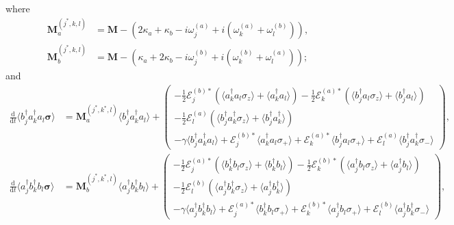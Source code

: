 \documentclass{article}
\newcommand{\ddt}[1][]{\frac{\mathrm{d} #1}{\mathrm{d}t}}
\begin{document}
where
\begin{subequations}
	\begin{align}
		\bm{M}^{(j^{*}, k, l)}_{a} &= \bm{M} - \left( 2\kappa_{a} + \kappa_{b} - i \omega_{j}^{(a)} + i \left( \omega_{k}^{(a)} + \omega_{l}^{(b)} \right) \right), \\
		\bm{M}^{(j^{*}, k, l)}_{b} &= \bm{M} - \left( \kappa_{a} + 2\kappa_{b} - i \omega_{j}^{(b)} + i \left( \omega_{k}^{(b)} + \omega_{l}^{(a)} \right) \right);
	\end{align}
\end{subequations}
and
\begin{subequations}
	\begin{align}
		\ddt \langle b^{\dagger}_{j} a^{\dagger}_{k} a_{l} \bm{\sigma} \rangle &= \bm{M}^{(j^{*}, k^{*}, l)}_{a} \langle b^{\dagger}_{j} a^{\dagger}_{k} a_{l} \rangle +
		\begin{pmatrix}
			-\frac{1}{2} \mathcal{E}_{j}^{(b) *} \left( \langle a^{\dagger}_{k} a_{l} \sigma_{z} \rangle + \langle a^{\dagger}_{k} a_{l} \rangle \right) - \frac{1}{2} \mathcal{E}_{k}^{(a) *} \left( \langle b^{\dagger}_{j} a_{l} \sigma_{z} \rangle + \langle b^{\dagger}_{j} a_{l} \rangle \right) \\
			-\frac{1}{2} \mathcal{E}_{l}^{(a)} \left( \langle b^{\dagger}_{j} a^{\dagger}_{k} \sigma_{z} \rangle + \langle b^{\dagger}_{j} a^{\dagger}_{k} \rangle \right) \\
			-\gamma \langle b^{\dagger}_{j} a^{\dagger}_{k} a_{l} \rangle + \mathcal{E}_{j}^{(b) *} \langle a^{\dagger}_{k} a_{l} \sigma_{+} \rangle + \mathcal{E}_{k}^{(a) *} \langle b^{\dagger}_{j} a_{l} \sigma_{+} \rangle + \mathcal{E}_{l}^{(a)} \langle b^{\dagger}_{j} a^{\dagger}_{k} \sigma_{-} \rangle
		\end{pmatrix}, \\
		\ddt \langle a^{\dagger}_{j} b^{\dagger}_{k} b_{l} \bm{\sigma} \rangle &= \bm{M}^{(j^{*}, k^{*}, l)}_{b} \langle a^{\dagger}_{j} b^{\dagger}_{k} b_{l} \rangle +
		\begin{pmatrix}
			-\frac{1}{2} \mathcal{E}_{j}^{(a) *} \left( \langle b^{\dagger}_{k} b_{l} \sigma_{z} \rangle + \langle b^{\dagger}_{k} b_{l} \rangle \right) - \frac{1}{2} \mathcal{E}_{k}^{(b) *} \left( \langle a^{\dagger}_{j} b_{l} \sigma_{z} \rangle + \langle a^{\dagger}_{j} b_{l} \rangle \right) \\
			-\frac{1}{2} \mathcal{E}_{l}^{(b)} \left( \langle a^{\dagger}_{j} b^{\dagger}_{k} \sigma_{z} \rangle + \langle a^{\dagger}_{j} b^{\dagger}_{k} \rangle \right) \\
			-\gamma \langle a^{\dagger}_{j} b^{\dagger}_{k} b_{l} \rangle + \mathcal{E}_{j}^{(a) *} \langle b^{\dagger}_{k} b_{l} \sigma_{+} \rangle + \mathcal{E}_{k}^{(b) *} \langle a^{\dagger}_{j} b_{l} \sigma_{+} \rangle + \mathcal{E}_{l}^{(b)} \langle a^{\dagger}_{j} b^{\dagger}_{k} \sigma_{-} \rangle
		\end{pmatrix},
	\end{align}
\end{subequations}
\end{document}
